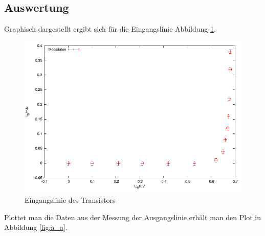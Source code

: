 \documentclass[12pt,a4paper]{article}
\begin{document}
\subsection{Auswertung}

Graphisch dargestellt ergibt sich für die Eingangslinie Abbildung \ref{fig:a_e}.

\begin{figure}[H] 
  \centering
    \includegraphics[scale = 0.7]{a_e.pdf}
  	\caption[Eingangslinie des Transistors]{Eingangslinie des Transistors}
  \label{fig:a_e}
\end{figure}

Plottet man die Daten aus der Messung der Ausgangslinie erhält man den Plot in Abbildung \ref{fig:a_a}.
\end{document}
